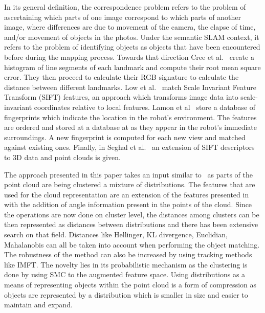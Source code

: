 \documentclass[twoside,hidelinks]{article}
\begin{document}
In its general definition, the correspondence problem refers to the problem of ascertaining which parts of one image correspond to which parts of another image, where differences are due to movement of the camera, the elapse of time, and/or movement of objects in the photos. Under the semantic SLAM context, it refers to the problem of identifying objects as objects that have been encountered before during the mapping process. Towards that direction Cree et al.~\cite{corresp:first} create a histogram of line segments of each landmark and compute their root mean square error. They then proceed to calculate their RGB signature to calculate the distance between different landmarks. Low et al.~\cite{corres:sec} match Scale Invariant Feature Transform (SIFT) features, an approach which transforms image data into scale-invariant coordinates relative to local features. Lamon et al~\cite{corres:three} store a database of fingerprints which indicate the location in the robot's environment. The features are ordered and stored at a database at as they appear in the robot's immediate surroundings. A new fingerprint is computed for each new view and matched against existing ones. Finally, in Seghal et al.~\cite{corres:four} an extension of SIFT descriptors to 3D data and point clouds is given.

The approach presented in this paper takes an input similar to~\cite{objectDisc} as parts of the point cloud are being clustered a mixture of distributions. The features that are used for the cloud representation are an extension of the features presented in~\cite{smcddp} with the addition of angle information present in the points of the cloud. Since the operations are now done on cluster level, the distances among clusters can be then represented as distances between distributions and there has been extensive search on that field. Distances like Hellinger, KL divergence, Euclidian, Mahalanobis can all be taken into account when performing the object matching. The robustness of the method can also be increased by using tracking methods like IMFT. The novelty lies in its probabilistic mechanism as the clustering is done by using SMC to the augmented feature space. Using distributions as a means of representing objects within the point cloud is a form of compression as objects are represented by a distribution which is smaller in size and easier to maintain and expand.
  


\end{document}
